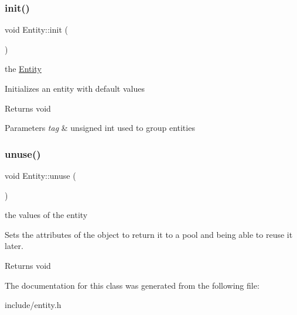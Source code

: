 \subsubsection{\texorpdfstring{init()}{init()}\hspace{0.1cm}{\footnotesize\ttfamily [2/2]}}
{\footnotesize\ttfamily void Entity\+::init (\begin{DoxyParamCaption}{ }\end{DoxyParamCaption})}

the \hyperlink{class_entity}{Entity}

Initializes an entity with default values

\begin{DoxyReturn}{Returns}
void 
\end{DoxyReturn}

\begin{DoxyParams}{Parameters}
{\em tag} & unsigned int used to group entities \\
\hline
\end{DoxyParams}
\mbox{\label{class_entity_ad40f9e3ddaa375d33c930c6b57f4c9c5}} 
\subsubsection{\texorpdfstring{unuse()}{unuse()}}
{\footnotesize\ttfamily void Entity\+::unuse (\begin{DoxyParamCaption}{ }\end{DoxyParamCaption})}

the values of the entity

Sets the attributes of the object to return it to a pool and being able to reuse it later.

\begin{DoxyReturn}{Returns}
void 
\end{DoxyReturn}


The documentation for this class was generated from the following file\+:\begin{DoxyCompactItemize}
\item 
include/entity.\+h\end{DoxyCompactItemize}
